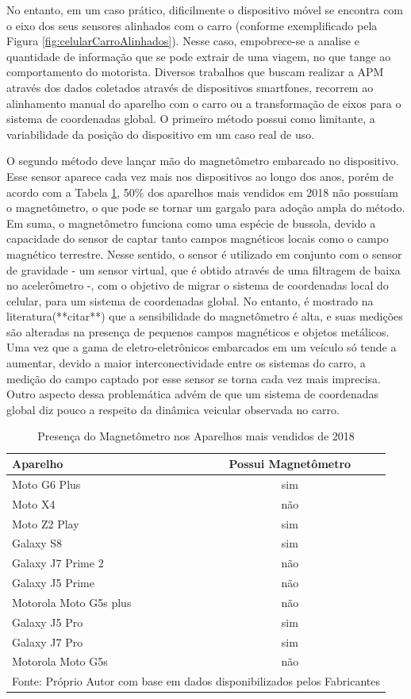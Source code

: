 No entanto, em um caso prático, dificilmente o dispositivo móvel se encontra com o eixo dos seus sensores alinhados com o carro (conforme exemplificado pela Figura \ref{fig:celularCarroAlinhados}). Nesse caso, empobrece-se a analise e quantidade de informação que se pode extrair de uma viagem, no que tange ao comportamento do motorista. Diversos trabalhos que buscam realizar a APM através dos dados coletados através de dispositivos smartfones, recorrem ao alinhamento manual do aparelho com o carro ou a transformação de eixos para o sistema de coordenadas global. O primeiro método possui como limitante, a variabilidade da posição do dispositivo em um caso real de uso.

O segundo método deve lançar mão do magnetômetro embarcado no dispositivo. Esse sensor aparece cada vez mais nos dispositivos ao longo dos anos, porém de acordo com a Tabela \ref{tab:aparelhosMaisVendidos}, 50\% dos aparelhos mais vendidos em 2018 não possuíam o magnetômetro, o que pode se tornar um gargalo para adoção ampla do método. Em suma, o magnetômetro funciona como uma espécie de bussola, devido a capacidade do sensor de captar tanto campos magnéticos locais como o campo magnético terrestre. Nesse sentido, o sensor é utilizado em conjunto com o sensor de gravidade - um sensor virtual, que é obtido através de uma filtragem de baixa no acelerômetro -, com o objetivo de migrar o sistema de coordenadas local do celular, para um sistema de coordenadas global. No entanto, é mostrado na literatura(**citar**) que a sensibilidade do magnetômetro é alta, e suas medições são alteradas na presença de pequenos campos magnéticos e objetos metálicos. Uma vez que a gama de eletro-eletrônicos embarcados em um veículo só tende a aumentar, devido a maior interconectividade entre os sistemas do carro, a medição do campo captado por esse sensor se torna cada vez mais imprecisa. Outro aspecto dessa problemática advém de que um sistema de coordenadas global diz pouco a respeito da dinâmica veicular observada no carro.


\begin{table}[]
\centering
\caption{Presença do Magnetômetro nos Aparelhos mais vendidos de 2018 }
\label{tab:aparelhosMaisVendidos}
\begin{tabular}{lc}
\textbf{Aparelho} & \textbf{Possui Magnetômetro} \\ \hline
Moto G6 Plus & sim \\
Moto X4 & não \\
Moto Z2 Play & sim \\
Galaxy S8 & sim \\
Galaxy J7 Prime 2 & não \\
Galaxy J5 Prime & não \\
Motorola Moto G5s plus & não \\
Galaxy J5 Pro & sim \\
Galaxy J7 Pro & sim \\
Motorola Moto G5s & não \\ \hline
\multicolumn{2}{l}{Fonte: Próprio Autor com base em dados disponibilizados pelos Fabricantes}
\end{tabular}
\end{table}




